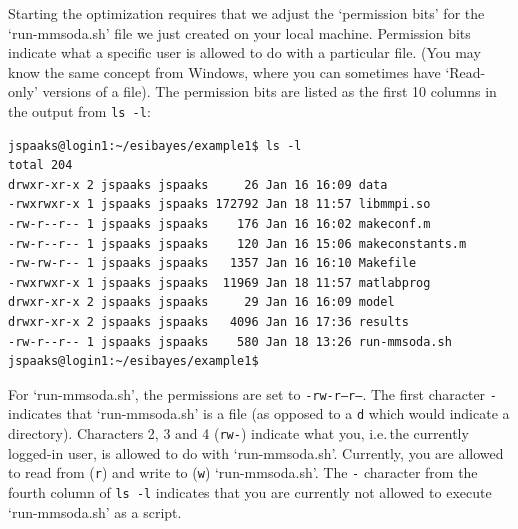 Starting the optimization requires that we adjust the `permission bits' for the `run-mmsoda.sh' file we just created on your local machine. Permission bits indicate what a specific user is allowed to do with a particular file. (You may know the same concept from Windows, where you can sometimes have `Read-only' versions of a file). The permission bits are listed as the first 10 columns in the output from \texttt{ls -l}:
\begin{lstlisting}[style=basic,style=bash]
jspaaks@login1:~/esibayes/example1$ ls -l
total 204
drwxr-xr-x 2 jspaaks jspaaks     26 Jan 16 16:09 data
-rwxrwxr-x 1 jspaaks jspaaks 172792 Jan 18 11:57 libmmpi.so
-rw-r--r-- 1 jspaaks jspaaks    176 Jan 16 16:02 makeconf.m
-rw-r--r-- 1 jspaaks jspaaks    120 Jan 16 15:06 makeconstants.m
-rw-rw-r-- 1 jspaaks jspaaks   1357 Jan 16 16:10 Makefile
-rwxrwxr-x 1 jspaaks jspaaks  11969 Jan 18 11:57 matlabprog
drwxr-xr-x 2 jspaaks jspaaks     29 Jan 16 16:09 model
drwxr-xr-x 2 jspaaks jspaaks   4096 Jan 16 17:36 results
-rw-r--r-- 1 jspaaks jspaaks    580 Jan 18 13:26 run-mmsoda.sh
jspaaks@login1:~/esibayes/example1$
\end{lstlisting}
For `run-mmsoda.sh', the permissions are set to \texttt{-rw-r--r--}. The first character \texttt{-} indicates that `run-mmsoda.sh' is a file (as opposed to a \texttt{d} which would indicate a directory). Characters 2, 3 and 4 (\texttt{rw-}) indicate what you, i.e.\,the currently logged-in user, is allowed to do with `run-mmsoda.sh'. Currently, you are allowed to read from (\texttt{r}) and write to (\texttt{w}) `run-mmsoda.sh'. The \texttt{-} character from the fourth column of \texttt{ls -l} indicates that you are currently not allowed to execute `run-mmsoda.sh' as a script.




